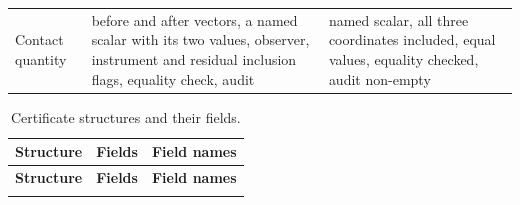 {\begin{longtable}{@{}>{\raggedright\arraybackslash}p{3.1cm}>{\raggedright\arraybackslash}p{5.6cm}>{\raggedright\arraybackslash}p{6.2cm}@{}}
Contact quantity & before and after vectors, a named scalar with its two values, observer, instrument and residual inclusion flags, equality check, audit & named scalar, all three coordinates included, equal values, equality checked, audit non-empty \\
\end{longtable}
}


{\scriptsize
\begin{longtable}{@{}>{\raggedright\arraybackslash}p{5.2cm}r>{\raggedright\arraybackslash}p{8.0cm}@{}}
\caption{Certificate structures and their fields.}\label{tab:fields}\\
\toprule
\textbf{Structure} & \textbf{Fields} & \textbf{Field names} \\
\midrule
\endfirsthead
\toprule
\textbf{Structure} & \textbf{Fields} & \textbf{Field names} \\
\midrule
\endhead
\bottomrule
\endfoot

\end{longtable}
}
